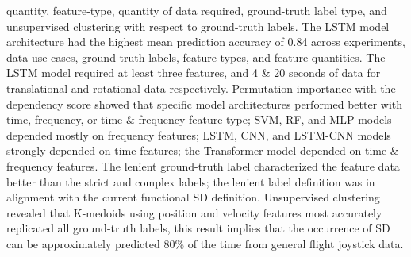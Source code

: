 \documentclass{ieeeaccess}
\begin{document}
quantity, feature-type, quantity of data required, ground-truth label type, and unsupervised clustering with respect to ground-truth labels. The LSTM model architecture had the highest mean prediction accuracy of 0.84 across experiments, data use-cases, ground-truth labels, feature-types, and feature quantities. The LSTM model required at least three features, and 4 \& 20 seconds of data for translational and rotational data respectively. Permutation importance with the dependency score showed that specific model architectures performed better with time, frequency, or time \& frequency feature-type; SVM, RF, and MLP models depended mostly on frequency features; LSTM, CNN, and LSTM-CNN models strongly depended on time features; the Transformer model depended on time & frequency features. The lenient ground-truth label characterized the feature data better than the strict and complex labels; the lenient label definition was in alignment with the current functional SD definition. Unsupervised clustering revealed that K-medoids using position and velocity features most accurately replicated all ground-truth labels, this result implies that the occurrence of SD can be approximately predicted 80\% of the time from general flight joystick data.








\end{document}
